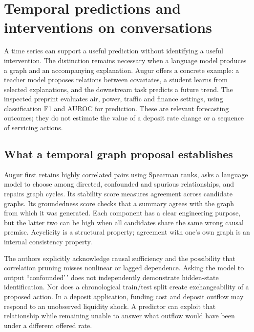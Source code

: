 \hypertarget{temporal-predictions-and-interventions-on-conversations}{%
\section{Temporal predictions and interventions on
conversations}\label{temporal-predictions-and-interventions-on-conversations}}

\label{exec13:census-temporal}

A time series can support a useful prediction without identifying a
useful intervention. The distinction remains necessary when a language
model produces a graph and an accompanying explanation. Augur offers a
concrete example: a teacher model proposes relations between covariates,
a student learns from selected explanations, and the downstream task
predicts a future trend. The inspected preprint evaluates air, power,
traffic and finance settings, using classification F1 and AUROC for
prediction. These are relevant forecasting outcomes; they do not
estimate the value of a deposit rate change or a sequence of servicing
actions. \cite{exec13_census_augur_arxiv}

\hypertarget{what-a-temporal-graph-proposal-establishes}{%
\subsection{What a temporal graph proposal
establishes}\label{what-a-temporal-graph-proposal-establishes}}

Augur first retains highly correlated pairs using Spearman ranks, asks a
language model to choose among directed, confounded and spurious
relationships, and repairs graph cycles. Its stability score measures
agreement across candidate graphs. Its groundedness score checks that a
summary agrees with the graph from which it was generated. Each
component has a clear engineering purpose, but the latter two can be
high when all candidates share the same wrong causal premise. Acyclicity
is a structural property; agreement with one's own graph is an internal
consistency property. \cite{exec13_census_augur_arxiv}

The authors explicitly acknowledge causal sufficiency and the
possibility that correlation pruning misses nonlinear or lagged
dependence. Asking the model to output ``confounded'\,' does not
independently demonstrate hidden-state identification. Nor does a
chronological train/test split create exchangeability of a proposed
action. In a deposit application, funding cost and deposit outflow may
respond to an unobserved liquidity shock. A predictor can exploit that
relationship while remaining unable to answer what outflow would have
been under a different offered rate.

